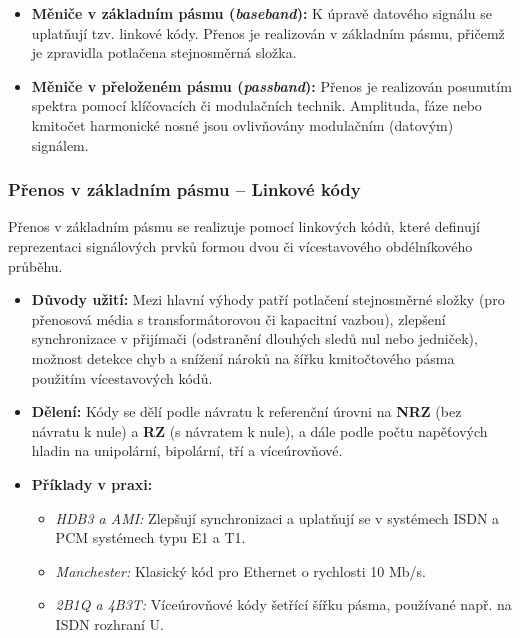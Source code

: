         \begin{itemize}
            \item \textbf{Měniče v základním pásmu (\textit{baseband}):} K úpravě datového signálu se uplatňují tzv. linkové kódy. Přenos je realizován v základním pásmu, přičemž je zpravidla potlačena stejnosměrná složka.
            \item \textbf{Měniče v přeloženém pásmu (\textit{passband}):} Přenos je realizován posunutím spektra pomocí klíčovacích či modulačních technik. Amplituda, fáze nebo kmitočet harmonické nosné jsou ovlivňovány modulačním (datovým) signálem.
        \end{itemize}
    \subsubsection{Přenos v základním pásmu -- Linkové kódy}
        Přenos v základním pásmu se realizuje pomocí linkových kódů, které definují reprezentaci signálových prvků formou dvou či vícestavového obdélníkového průběhu.
        \begin{itemize}
            \item \textbf{Důvody užití:} Mezi hlavní výhody patří potlačení stejnosměrné složky (pro přenosová média s transformátorovou či kapacitní vazbou), zlepšení synchronizace v přijímači (odstranění dlouhých sledů nul nebo jedniček), možnost detekce chyb a snížení nároků na šířku kmitočtového pásma použitím vícestavových kódů.
            \item \textbf{Dělení:} Kódy se dělí podle návratu k referenční úrovni na \textbf{NRZ} (bez návratu k nule) a \textbf{RZ} (s návratem k nule), a dále podle počtu napěťových hladin na unipolární, bipolární, tří a víceúrovňové.
            \item \textbf{Příklady v praxi:}
            \begin{itemize}
                \item \textit{HDB3 a AMI:} Zlepšují synchronizaci a uplatňují se v systémech ISDN a PCM systémech typu E1 a T1.
                \item \textit{Manchester:} Klasický kód pro Ethernet o rychlosti 10 Mb/s.
                \item \textit{2B1Q a 4B3T:} Víceúrovňové kódy šetřící šířku pásma, používané např. na ISDN rozhraní U.
            \end{itemize}
        \end{itemize}
